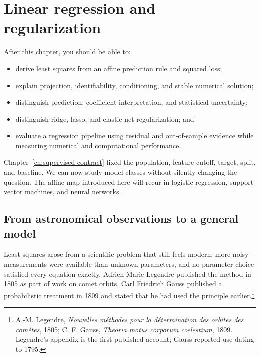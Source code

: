 \chapter{Linear regression and regularization}
\label{ch:linear-regression}

\begin{learningobjectives}
After this chapter, you should be able to:
\begin{itemize}
  \item derive least squares from an affine prediction rule and squared loss;
  \item explain projection, identifiability, conditioning, and stable numerical
  solution;
  \item distinguish prediction, coefficient interpretation, and statistical
  uncertainty;
  \item distinguish ridge, lasso, and elastic-net regularization; and
  \item evaluate a regression pipeline using residual and out-of-sample
  evidence while measuring numerical and computational performance.
\end{itemize}
\end{learningobjectives}

\begin{chapterconnection}
Chapter~\ref{ch:supervised-contract} fixed the population, feature cutoff,
target, split, and baseline. We can now study model classes without silently
changing the question. The affine map introduced here will recur in logistic
regression, support-vector machines, and neural networks.
\end{chapterconnection}

\section{From astronomical observations to a general model}

Least squares arose from a scientific problem that still feels modern: more
noisy measurements were available than unknown parameters, and no parameter
choice satisfied every equation exactly. Adrien-Marie Legendre published the
method in 1805 as part of work on comet orbits. Carl Friedrich Gauss published
a probabilistic treatment in 1809 and stated that he had used the principle
earlier.\footnote{A.-M. Legendre, \emph{Nouvelles m\'ethodes pour la
d\'etermination des orbites des com\`etes}, 1805; C. F. Gauss, \emph{Theoria
motus corporum coelestium}, 1809. Legendre's appendix is the first published
account; Gauss reported use dating to 1795.}

